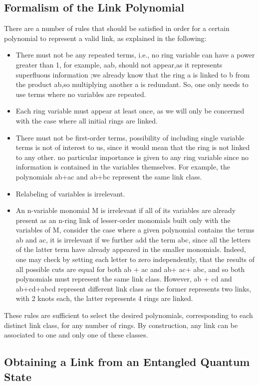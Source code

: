 \documentclass{scrartcl}
\begin{document}
\subsection{Formalism of the Link Polynomial}
There are a number of rules that should be satisfied in order for a certain polynomial to represent a valid link, as explained in the following:
\begin{itemize}
    \item{There must not be any repeated terms, i.e., no ring variable can have a power greater than 1, for example, aab,
    should not appear,as it represents superfluous information ;we already know that the ring a is linked to b from the product ab,so multiplying another a is redundant. So, one only needs to use terms where no variables are repeated.}
    \item{Each ring variable must appear at least once, as we will only be concerned with the case where all initial rings are linked.}
    \item{There must not be first-order terms, possibility of including single variable terms is not of interest to us, since it would mean that the ring is not linked to any other. no particular importance is given to any ring variable since no information is contained in the variables themselves. For example, the polynomials ab+ac and ab+bc represent the same link class.}
    \item{ Relabeling of variables is irrelevant.}
    \item{An n-variable monomial M is irrelevant if all of its variables are already present as an n-ring link of lesser-order  monomials built only with the variables of M, consider the case where a given polynomial contains the terms ab and ac, it is irrelevant if we further add the term abc, since all the letters of the latter term have already appeared in the smaller monomials. Indeed, one may check by
    setting each letter to zero independently, that the results of all possible cuts are equal for both ab + ac and ab+ ac+ abc, and so both polynomials must represent the same link class. However, ab + cd and ab+cd+abcd represent different link class as the former represents two links, with 2 knots each, the latter represents 4 rings are linked.}
\end{itemize}
These rules are sufficient to select the desired polynomials, corresponding to each distinct link class, for any number of rings.  By construction, any link can be associated to one and only one of these classes. 
\subsection{Obtaining a Link from an Entangled Quantum State}\label{link_from_state}
\end{document}
